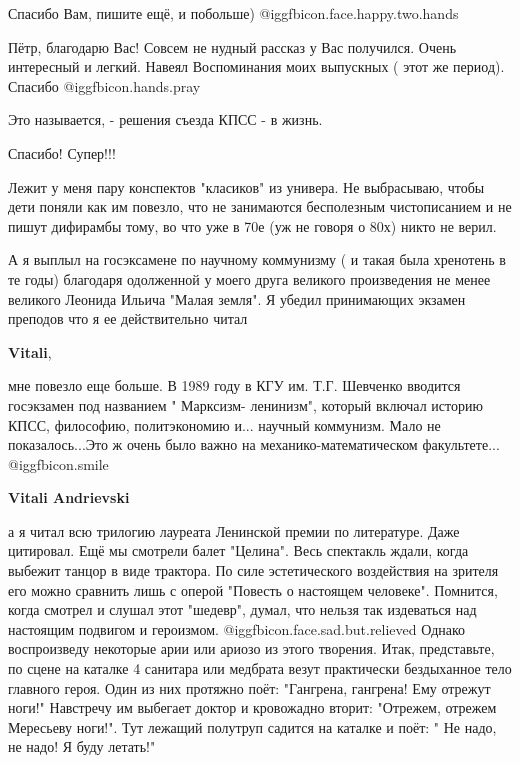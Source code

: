 \begin{itemize}
Спасибо Вам, пишите ещё, и побольше) @igg{fbicon.face.happy.two.hands} 


Пётр, благодарю Вас! Совсем не нудный рассказ у Вас получился. Очень интересный
и легкий. Навеял Воспоминания моих выпускных ( этот же период). Спасибо  @igg{fbicon.hands.pray} 

Это называется, - решения съезда КПСС - в жизнь.

Спасибо! Супер!!!


Лежит у меня пару конспектов "класиков" из универа. Не выбрасываю, чтобы дети
поняли как им повезло, что не занимаются бесполезным чистописанием и не пишут
дифирамбы тому, во что уже в 70е (уж не говоря о 80х) никто не верил.


А я выплыл на госэксамене по научному коммунизму ( и такая была хренотень в те
годы) благодаря одолженной у моего друга великого произведения не менее
великого Леонида Ильича "Малая земля". Я убедил принимающих экзамен преподов
что я ее действительно читал

\begin{itemize} %
\textbf{Vitali}, 

мне повезло еще больше. В 1989 году в КГУ им. Т.Г. Шевченко вводится госэкзамен
под названием " Марксизм- ленинизм", который включал историю КПСС, философию,
политэкономию и... научный коммунизм. Мало не показалось...Это ж очень было
важно на механико-математическом факультете... @igg{fbicon.smile} 

\textbf{Vitali Andrievski} 

а я читал всю трилогию лауреата Ленинской премии по литературе. Даже цитировал.
Ещё мы смотрели балет "Целина". Весь спектакль ждали, когда выбежит танцор в
виде трактора. По силе эстетического воздействия на зрителя его можно сравнить
лишь с оперой "Повесть о настоящем человеке". Помнится, когда смотрел и слушал
этот "шедевр", думал, что нельзя так издеваться над настоящим подвигом и
героизмом.  @igg{fbicon.face.sad.but.relieved}  Однако воспроизведу некоторые
арии или ариозо из этого творения.  Итак, представьте, по сцене на каталке 4
санитара или медбрата везут практически бездыханное тело главного героя. Один
из них протяжно поёт: "Гангрена, гангрена! Ему отрежут ноги!" Навстречу им
выбегает доктор и кровожадно вторит: "Отрежем, отрежем Мересьеву ноги!". Тут
лежащий полутруп садится на каталке и поёт: " Не надо, не надо! Я буду летать!"


\end{itemize}
\end{itemize}
